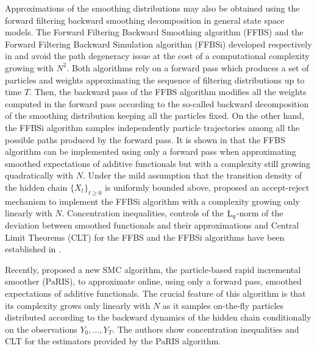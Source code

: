 Approximations of the smoothing distributions may also be obtained using the forward filtering backward smoothing decomposition in general state space models.  The Forward Filtering Backward Smoothing algorithm (FFBS) and  the Forward Filtering Backward Simulation algorithm (FFBSi) developed respectively in \cite{doucet:godsill:andrieu:2000,huerzeler:kunsch:1998,kitagawa:1996} and \cite{godsill:doucet:west:2004} avoid the path degeneracy issue at the cost of a computational complexity growing with $N^2$. Both algorithms rely on a forward pass which produces a set of particles and weights approximating the sequence of filtering distributions up to time $T$. Then, the backward pass of the FFBS algorithm modifies all the weights computed in the forward pass according to the so-called  backward decomposition of the smoothing distribution keeping all the particles fixed. On the other hand, the FFBSi  algorithm samples independently particle trajectories among all the possible paths produced by the forward pass. It is  shown in \cite{cappe:2011,delmoral:doucet:singh:2010,mongillo:deneve:2008} that the FFBS algorithm can be implemented using only a forward pass when approximating smoothed expectations of additive functionals but with a complexity still growing quadratically with $N$.  Under the mild assumption that the transition density of the hidden chain $\{X_{t}\}_{t\geq 0}$ is uniformly bounded above, \cite{douc:garivier:moulines:olsson:2011} proposed an accept-reject mechanism to implement the FFBSi algorithm with a complexity growing only linearly with $N$. Concentration inequalities,  controls of the $\mathrm{L}_{q}$-norm of the deviation between smoothed functionals and their approximations and Central Limit Theorems (CLT) for the FFBS and the FFBSi algorithms have been established in \cite{delmoral:doucet:singh:2010,douc:garivier:moulines:olsson:2011,dubarry:lecorff:2013}.

Recently, \cite{olsson:westerborn:2015} proposed a new SMC algorithm, the particle-based rapid incremental smoother (PaRIS), to approximate online, using only a forward pass, smoothed expectations of additive functionals. The crucial feature of this algorithm is that its complexity grows only linearly with $N$ as it samples on-the-fly particles distributed according to the backward dynamics of the hidden chain conditionally on the observations $Y_0,\ldots,Y_T$.  The authors show concentration inequalities and CLT for the estimators provided by the PaRIS algorithm.

